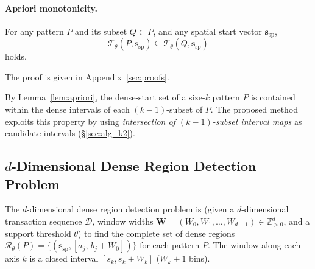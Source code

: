 \paragraph{Apriori monotonicity.}

\begin{lemma}\label{lem:apriori}
For any pattern $P$ and its subset $Q \subset P$,
and any spatial start vector $\bm{s}_{\mathrm{sp}}$,
\[
  \mathcal{T}_\theta(P,\bm{s}_{\mathrm{sp}})
  \subseteq
  \mathcal{T}_\theta(Q,\bm{s}_{\mathrm{sp}})
\]
holds.
\end{lemma}

The proof is given in Appendix~\ref{sec:proofs}.

By Lemma~\ref{lem:apriori},
the dense-start set of a size-$k$ pattern $P$
is contained within the dense intervals
of each $(k{-}1)$-subset of $P$.
The proposed method exploits this property
by using \emph{intersection of $(k{-}1)$-subset interval maps}
as candidate intervals (\S\ref{sec:alg_k2}).

\subsection{$d$-Dimensional Dense Region Detection Problem}\label{sec:dense_detection}

The $d$-dimensional dense region detection problem is
(given a $d$-dimensional transaction sequence $\mathcal{D}$,
window widths
$\bm{W} = (W_0, W_1, \ldots, W_{d-1}) \in \mathbb{Z}_{>0}^d$,
and a support threshold $\theta$)
to find the complete set of dense regions
$\mathcal{R}_\theta(P)
= \{(\bm{s}_{\mathrm{sp}}, [a_j,\, b_j + W_0])\}$
for each pattern $P$.
The window along each axis $k$ is a closed interval
$[s_k, s_k + W_k]$ ($W_k + 1$ bins).
